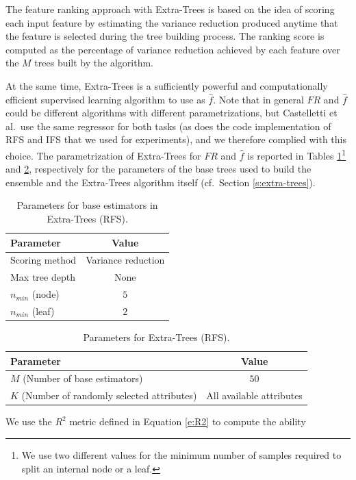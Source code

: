 The feature ranking approach with Extra-Trees is based on the idea of scoring
each input feature by estimating the variance reduction produced anytime that 
the feature is selected during the tree building process. The ranking score is
computed as the percentage of variance reduction achieved by each feature over 
the $M$ trees built by the algorithm.

At the same time, Extra-Trees is a sufficiently powerful and computationally 
efficient supervised learning algorithm to use as $\hat{f}$.
Note that in general $FR$ and $\hat{f}$ could be different algorithms with 
different parametrizations, but Castelletti et al.\ use the same regressor for 
both tasks (as does the code implementation of RFS and IFS that we used for 
experiments), and we therefore complied with this choice.
The parametrization of Extra-Trees for $FR$ and $\hat{f}$ is reported in Tables
\ref{t:RFS_tree_params}\footnote{We use two different values for the minimum 
number of samples required to split an internal node or a leaf.} and 
\ref{t:RFS_extra_params}, respectively for the parameters of the base trees used
to build the ensemble and the Extra-Trees algorithm itself (cf.\ Section 
\ref{s:extra-trees}).
%
\begin{table}	
    \centering
    \begin{tabular}{l c} 
	\hline
	Parameter & Value \\ 
	\hline 
	Scoring method &  Variance reduction \\
	Max tree depth & None \\
	$n_{min}$ (node) & $5$\\
	$n_{min}$ (leaf) & $2$ \\
	\hline
    \end{tabular}
    \caption{Parameters for base estimators in Extra-Trees (RFS).}
    \label{t:RFS_tree_params}
\end{table}
%
%
\begin{table}
    \centering
    \begin{tabular}{l c} 
	\hline
	Parameter & Value \\ 
	\hline 
	$M$ (Number of base estimators) & $50$ \\
	$K$ (Number of randomly selected attributes) &  All available attributes \\
	\hline
    \end{tabular}
    \caption{Parameters for Extra-Trees (RFS).}
    \label{t:RFS_extra_params}
\end{table}
%
We use the $R^2$ metric defined in Equation \eqref{e:R2} to compute the ability
